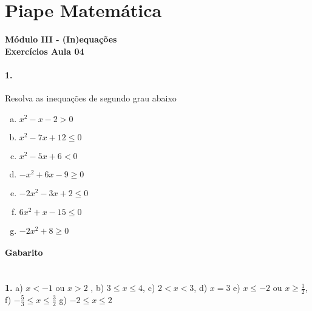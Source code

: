 \documentclass[a4paper,12pt]{article}
\begin{document}
 
  
\section*{Piape Matemática} 
\textbf{Módulo III - (In)equações}\\
\textbf{Exercícios Aula 04}         
\begin{multicols}{2}
\paragraph*{1.} Resolva as inequações de segundo grau abaixo
\begin{enumerate}[a)]    
    \item $x^2 - x - 2 > 0$ 
    \item $x^2 -7x + 12 \le 0$
    \item $x^2 - 5x + 6 < 0$
    \item $-x^2 + 6x  - 9  \ge 0$
    \item $-2x^2 -3x + 2 \le 0$ 
    \item $6x^2 + x - 15 \le 0$
    \item $-2x^2 + 8 \ge 0$
\end{enumerate}
 \vspace*{6cm}
\end{multicols}
 
\vspace*{\fill}
{\footnotesize
\paragraph*{Gabarito} \hspace*{\fill}\\
\textbf{1.}
    a) $x < -1$ ou $x > 2$ ,
    b) $3 \le x \le 4$,
    c) $2 < x < 3$,
    d) $x = 3$
    e) $x\le -2$ ou $x\ge\frac{1}{2}$,
    f) $ -\frac{5}{3}\le x \le \frac{3}{2}$
    g) $-2 \le x \le 2$
}
\end{document}
